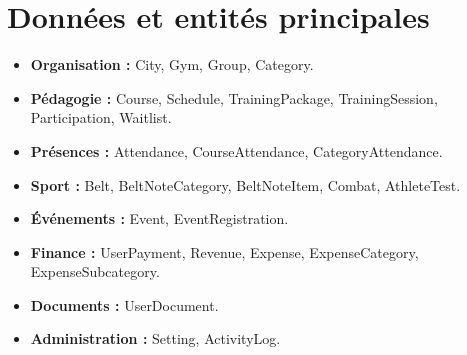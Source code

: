 \documentclass[12pt, a4paper]{article}
\begin{document}
\section{Données et entités principales}
\begin{itemize}
    \item \textbf{Organisation :} City, Gym, Group, Category.
    \item \textbf{Pédagogie :} Course, Schedule, TrainingPackage, TrainingSession, Participation, Waitlist.
    \item \textbf{Présences :} Attendance, CourseAttendance, CategoryAttendance.
    \item \textbf{Sport :} Belt, BeltNoteCategory, BeltNoteItem, Combat, AthleteTest.
    \item \textbf{Événements :} Event, EventRegistration.
    \item \textbf{Finance :} UserPayment, Revenue, Expense, ExpenseCategory, ExpenseSubcategory.
    \item \textbf{Documents :} UserDocument.
    \item \textbf{Administration :} Setting, ActivityLog.
\end{itemize}
\end{document}
